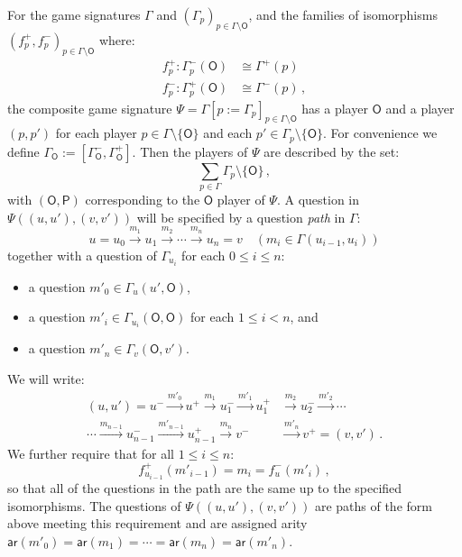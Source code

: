 \documentclass[format=sigplan,authordraft]{acmart}
\newcommand{\kw}[1]{\ensuremath{ \mathsf{#1} }}
\begin{document}
\begin{definition}
For the game signatures $\Gamma$
and $(\Gamma_p)_{p \in \Gamma \setminus \kw{O}}$,
and the families of isomorphisms
$(f^+_p, f^-_p)_{p \in \Gamma \setminus \kw{O}}$
where:
\begin{align*}
    f_p^+ : \Gamma_p^-(\kw{O}) &\cong \Gamma^+(p)
    \\
    f_p^- : \Gamma_p^+(\kw{O}) &\cong \Gamma^-(p) \,,
\end{align*}
the composite game signature
$\Psi = \Gamma[p := \Gamma_p]_{p \in \Gamma \setminus \kw{O}}$
has a player $\kw{O}$ and a player $(p, p')$ for
each player $p \in \Gamma \setminus \{\kw{O}\}$ and
each $p' \in \Gamma_p \setminus \{\kw{O}\}$.
For convenience
we define $\Gamma_\kw{O} := [\Gamma_\kw{O}^-, \Gamma_\kw{O}^+]$.
Then the players of $\Psi$ are described by the set:
\[
  \sum_{p \in \Gamma} \Gamma_p \setminus \{\kw{O}\} \,,
\]
with $(\kw{O}, \kw{P})$ corresponding to the
$\kw{O}$ player of $\Psi$.
A question in $\Psi((u, u'), (v, v'))$
will be specified by
a question \emph{path} in $\Gamma$:
\[
  u = u_0 \xrightarrow{m_1}
      u_1 \xrightarrow{m_2}
      \cdots \xrightarrow{m_n}
      u_n = v
  \quad
  (m_i \in \Gamma(u_{i-1}, u_i))
\]
together with a question of $\Gamma_{u_i}$ for each $0 \le i \le n$:
\begin{itemize}
\item a question $m'_0 \in \Gamma_u(u', \kw{O})$,
\item a question $m'_i \in \Gamma_{u_i}(\kw{O}, \kw{O})$ for each $1 \le i < n$, and
\item a question $m'_n \in \Gamma_v(\kw{O}, v')$.
\end{itemize}
We will write:
\begin{align*}
  (u, u') = u^- \xrightarrow{m'_0} u^+
          \xrightarrow{m_1} u_1^-
          \xrightarrow{m'_1} u_1^+
         &\xrightarrow{m_2} u_2^-
          \xrightarrow{m'_2} \cdots \\ \cdots
          \xrightarrow{m_{n-1}} u_{n-1}^-
          \xrightarrow{m'_{n-1}} u_{n-1}^+
          \xrightarrow{m_{n}} v^-
         &\xrightarrow{m'_n} v^+ = (v, v') \,.
\end{align*}
We further require that for all $1 \le i \le n$:
\[ f^+_{u_{i-1}}(m'_{i-1}) = m_i =
   f^-_u(m'_{i}) \,, \]
so that all of the questions in the path
are the same up to the specified isomorphisms.
The questions of $\Psi((u, u'), (v, v'))$
are paths of the form above meeting this requirement
and are assigned arity
$\kw{ar}(m'_0) = \kw{ar}(m_1) = \cdots = \kw{ar}(m_n) = \kw{ar}(m'_n)$.
\end{definition}
\end{document}
